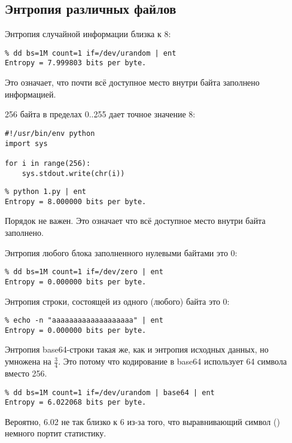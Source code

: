 \subsection{Энтропия различных файлов}

Энтропия случайной информации близка к 8:

\begin{lstlisting}
% dd bs=1M count=1 if=/dev/urandom | ent
Entropy = 7.999803 bits per byte.
\end{lstlisting}

Это означает, что почти всё доступное место внутри байта заполнено информацией.

256 байта в пределах 0..255 дает точное значение 8:

\begin{lstlisting}[style=custompy]
#!/usr/bin/env python
import sys

for i in range(256):
    sys.stdout.write(chr(i))
\end{lstlisting}

\begin{lstlisting}
% python 1.py | ent
Entropy = 8.000000 bits per byte.
\end{lstlisting}

Порядок не важен.
Это означает что всё доступное место внутри байта заполнено.

Энтропия любого блока заполненного нулевыми байтами это 0:

\begin{lstlisting}
% dd bs=1M count=1 if=/dev/zero | ent
Entropy = 0.000000 bits per byte.
\end{lstlisting}

Энтропия строки, состоящей из одного (любого) байта это 0:

\begin{lstlisting}
% echo -n "aaaaaaaaaaaaaaaaaaa" | ent
Entropy = 0.000000 bits per byte.
\end{lstlisting}

Энтропия base64-строки такая же, как и энтропия исходных данных, но умножена на $\frac{3}{4}$.
Это потому что кодирование в base64 использует 64 символа вместо 256.

\begin{lstlisting}
% dd bs=1M count=1 if=/dev/urandom | base64 | ent
Entropy = 6.022068 bits per byte.
\end{lstlisting}

Вероятно, 6.02 не так близко к 6 из-за того, что выравнивающий символ (\TT{=}) немного портит статистику.

